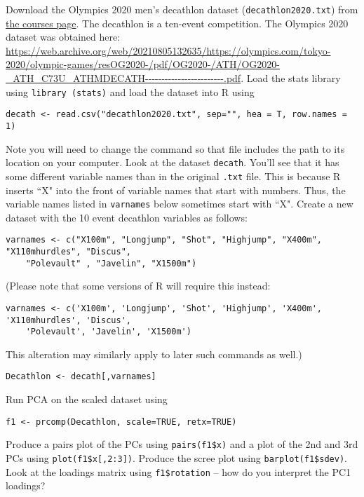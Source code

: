 \documentclass[answers]{exam}
\begin{document}
\begin{questions}
\question%
Download the Olympics 2020 men's decathlon dataset (\texttt{decathlon2020.txt}) from \href{https://courses.maths.ox.ac.uk/course/view.php?id=620}{the courses page}. The decathlon is a ten-event competition. The Olympics 2020 dataset was obtained here: \url{https://web.archive.org/web/20210805132635/https://olympics.com/tokyo-2020/olympic-games/resOG2020-/pdf/OG2020-/ATH/OG2020-\_ATH\_C73U\_ATHMDECATH------------------------.pdf}. Load the stats library using \verb|library (stats)| and load the dataset into R using \begin{verbatim}
decath <- read.csv("decathlon2020.txt", sep="", hea = T, row.names = 1)
\end{verbatim} Note you will need to change the command so that file includes the path to its location on your computer. Look at the dataset \texttt{decath}. You'll see that it has some different variable names than in the original \texttt{.txt} file. This is because R inserts ``X" into the front of variable names that start with numbers. Thus, the variable names listed in \texttt{varnames} below sometimes start with ``X". Create a new dataset with the 10 event decathlon variables as follows: \begin{verbatim}
varnames <- c("X100m", "Longjump", "Shot", "Highjump", "X400m", "X110mhurdles", "Discus",
    "Polevault" , "Javelin", "X1500m")
\end{verbatim} (Please note that some versions of R will require this instead: \begin{verbatim}
varnames <- c('X100m', 'Longjump', 'Shot', 'Highjump', 'X400m', 'X110mhurdles', 'Discus',
    'Polevault', 'Javelin', 'X1500m')
\end{verbatim} This alteration may similarly apply to later such commands as well.) \begin{verbatim}
Decathlon <- decath[,varnames]
\end{verbatim} Run PCA on the scaled dataset using \begin{verbatim}
f1 <- prcomp(Decathlon, scale=TRUE, retx=TRUE)
\end{verbatim} Produce a pairs plot of the PCs using \verb|pairs(f1$x)| and a plot of the 2nd and 3rd PCs using \verb|plot(f1$x[,2:3])|. Produce the scree plot using \verb|barplot(f1$sdev)|. Look at the loadings matrix using \verb|f1$rotation| -- how do you interpret the PC1 loadings?




\end{questions}
\end{document}
